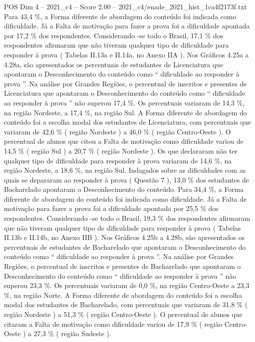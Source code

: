 \begin{textsample}{POS Dim 4 – 2021\_c4 – Score 2.00 – 2021\_c4/enade\_2021\_hist\_1ca4f2173f.txt}
Para 43,4 \%, a Forma diferente de abordagem do conteúdo foi indicada como dificuldade.
Já a Falta de motivação para fazer a prova foi a dificuldade apontada por 17,2 \% dos respondentes.
Considerando -se todo o Brasil, 17,1 \% dos respondentes afirmaram que não tiveram qualquer tipo de dificuldade para responder à prova ( Tabelas II.13a e II.14a, no Anexo IIA ).
Nos Gráficos 4.25a a 4.28a, são apresentados os percentuais de estudantes de Licenciatura que apontaram o Desconhecimento do conteúdo como “ dificuldade ao responder à prova ”.
Na análise por Grandes Regiões, o percentual de inscritos e presentes de Licenciatura que apontaram o Desconhecimento do conteúdo como “ dificuldade ao responder à prova ” não superou 17,4 \%.
Os percentuais variaram de 14,3 \%, na região Nordeste, a 17,4 \%, na região Sul.
A Forma diferente de abordagem do conteúdo foi a escolha modal dos estudantes de Licenciatura, com percentuais que variaram de 42,6 \% ( região Nordeste ) a 46,0 \% ( região Centro-Oeste ).
O percentual de alunos que citou a Falta de motivação como dificuldade variou de 14,5 \% ( região Sul ) a 20,7 \% ( região Nordeste ).
Os que declararam não ter qualquer tipo de dificuldade para responder à prova variaram de 14,6 \%, na região Nordeste, a 18,6 \%, na região Sul.
Indagados sobre as dificuldades com as quais se depararam ao responder à prova ( Questão 7 ), 13,0 \% dos estudantes de Bacharelado apontaram o Desconhecimento do conteúdo.
Para 34,4 \%, a Forma diferente de abordagem do conteúdo foi indicada como dificuldade.
Já a Falta de motivação para fazer a prova foi a dificuldade apontada por 25,5 \% dos respondentes.
Considerando -se todo o Brasil, 19,3 \% dos respondentes afirmaram que não tiveram qualquer tipo de dificuldade para responder à prova ( Tabelas II.13b e II.14b, no Anexo IIB ).
Nos Gráficos 4.25b a 4.28b, são apresentados os percentuais de estudantes de Bacharelado que apontaram o Desconhecimento do conteúdo como “ dificuldade ao responder à prova ”.
Na análise por Grandes Regiões, o percentual de inscritos e presentes de Bacharelado que apontaram o Desconhecimento do conteúdo como “ dificuldade ao responder à prova ” não superou 23,3 \%.
Os percentuais variaram de 0,0 \%, na região Centro-Oeste a 23,3 \%, na região Norte.
A Forma diferente de abordagem do conteúdo foi a escolha modal dos estudantes de Bacharelado, com percentuais que variaram de 31,8 \% ( região Nordeste ) a 51,3 \% ( região Centro-Oeste ).
O percentual de alunos que citaram a Falta de motivação como dificuldade variou de 17,9 \% ( região Centro-Oeste ) a 27,3 \% ( região Sudeste ).

\end{textsample}
